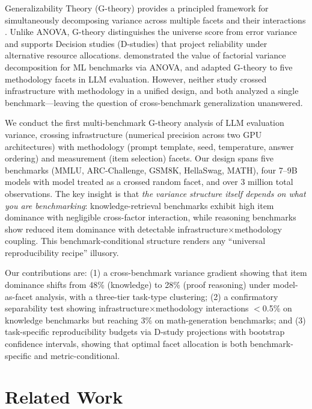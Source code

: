 \documentclass[11pt,twocolumn]{article}
\begin{document}
Generalizability Theory (G-theory) provides a principled framework for simultaneously decomposing variance across multiple facets and their interactions \citep{shavelson1991,brennan2001}. Unlike ANOVA, G-theory distinguishes the universe score from error variance and supports Decision studies (D-studies) that project reliability under alternative resource allocations. \citet{bouthillier2021} demonstrated the value of factorial variance decomposition for ML benchmarks via ANOVA, and \citet{mesting2026} adapted G-theory to five methodology facets in LLM evaluation. However, neither study crossed infrastructure with methodology in a unified design, and both analyzed a single benchmark---leaving the question of cross-benchmark generalization unanswered.

We conduct the first multi-benchmark G-theory analysis of LLM evaluation variance, crossing infrastructure (numerical precision across two GPU architectures) with methodology (prompt template, seed, temperature, answer ordering) and measurement (item selection) facets. Our design spans five benchmarks (MMLU, ARC-Challenge, GSM8K, HellaSwag, MATH), four 7--9B models with model treated as a crossed random facet, and over 3 million total observations. The key insight is that \emph{the variance structure itself depends on what you are benchmarking}: knowledge-retrieval benchmarks exhibit high item dominance with negligible cross-factor interaction, while reasoning benchmarks show reduced item dominance with detectable infrastructure$\times$methodology coupling. This benchmark-conditional structure renders any ``universal reproducibility recipe'' illusory.

Our contributions are: (1) a cross-benchmark variance gradient showing that item dominance shifts from 48\% (knowledge) to 28\% (proof reasoning) under model-as-facet analysis, with a three-tier task-type clustering; (2) a confirmatory separability test showing infrastructure$\times$methodology interactions $<$0.5\% on knowledge benchmarks but reaching 3\% on math-generation benchmarks; and (3) task-specific reproducibility budgets via D-study projections with bootstrap confidence intervals, showing that optimal facet allocation is both benchmark-specific and metric-conditional.

\section{Related Work}
\end{document}
